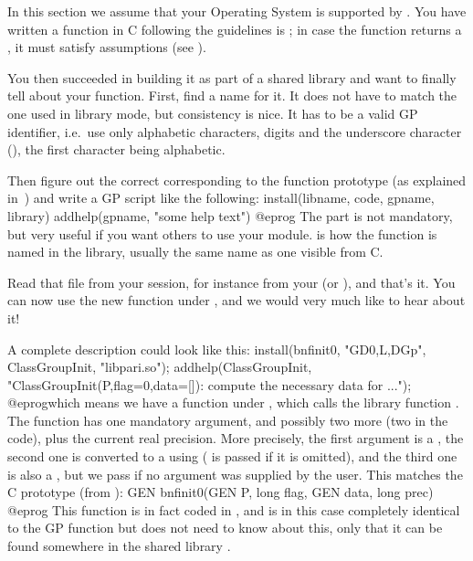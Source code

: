 In this section we assume that your Operating System is supported by
. You have written a function in C following the guidelines is
; in case the function returns a , it
must satisfy  assumptions (see ).

You then succeeded in building it as part of a shared library and want to
finally tell  about your function. First, find a name for it. It does
not have to match the one used in library mode, but consistency is nice. It
has to be a valid GP identifier, i.e.~use only alphabetic characters, digits
and the underscore character (\kbd{\_}), the first character being
alphabetic.

Then figure out the correct  corresponding to the function
prototype (as explained in~) and write a GP script
like the following:
\bprog
install(libname, code, gpname, library)
addhelp(gpname, "some help text")
@eprog
\noindent The  part is not mandatory, but very useful if you
want others to use your module.  is how the function is named in
the library, usually the same name as one visible from C.

Read that file from your  session, for instance from your
 (or ), and that's it. You
can now use the new function  under , and we would very
much like to hear about it!
\smallskip

A complete description could look like this:
\bprog
{
  install(bnfinit0, "GD0,L,DGp", ClassGroupInit, "libpari.so");
  addhelp(ClassGroupInit, "ClassGroupInit(P,{flag=0},{data=[]}):
    compute the necessary data for ...");
}
@eprog\noindent which means we have a function  under
, which calls the library function  . The function has
one mandatory argument, and possibly two more (two  in the code),
plus the current real precision. More precisely, the first argument is a
, the second one is converted to a  using 
( is passed if it is omitted), and the third one is also a ,
but we pass  if no argument was supplied by the user. This matches
the C prototype (from ):
%
\bprog
  GEN bnfinit0(GEN P, long flag, GEN data, long prec)
@eprog\noindent
This function is in fact coded in , and is in this case
completely identical to the GP function  but  does not
need to know about this, only that it can be found somewhere in the shared
library .

